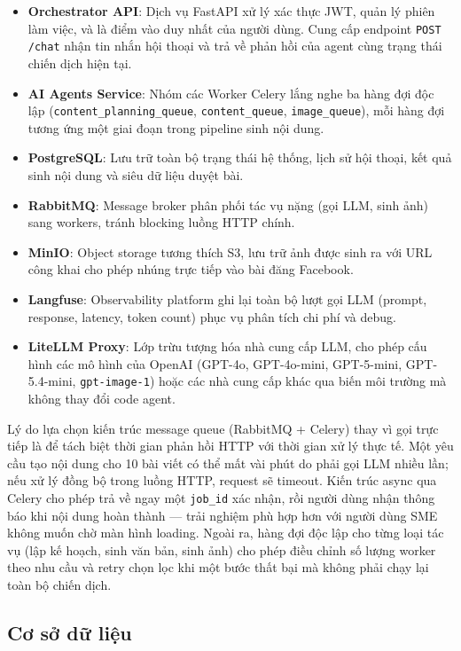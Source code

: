 \begin{itemize}
  \item \textbf{Orchestrator API}: Dịch vụ FastAPI xử lý xác thực JWT,
    quản lý phiên làm việc, và là điểm vào duy nhất của người dùng. Cung
    cấp endpoint \texttt{POST /chat} nhận tin nhắn hội thoại và trả về
    phản hồi của agent cùng trạng thái chiến dịch hiện tại.
  \item \textbf{AI Agents Service}: Nhóm các Worker Celery lắng nghe ba
    hàng đợi độc lập (\texttt{content\_planning\_queue},
    \texttt{content\_queue}, \texttt{image\_queue}), mỗi hàng đợi tương
    ứng một giai đoạn trong pipeline sinh nội dung.
  \item \textbf{PostgreSQL}: Lưu trữ toàn bộ trạng thái hệ thống, lịch
    sử hội thoại, kết quả sinh nội dung và siêu dữ liệu duyệt bài.
  \item \textbf{RabbitMQ}: Message broker phân phối tác vụ nặng (gọi LLM,
    sinh ảnh) sang workers, tránh blocking luồng HTTP chính.
  \item \textbf{MinIO}: Object storage tương thích S3, lưu trữ ảnh được
    sinh ra với URL công khai cho phép nhúng trực tiếp vào bài đăng
    Facebook.
  \item \textbf{Langfuse}: Observability platform ghi lại toàn bộ lượt
    gọi LLM (prompt, response, latency, token count) phục vụ phân tích
    chi phí và debug.
  \item \textbf{LiteLLM Proxy}: Lớp trừu tượng hóa nhà cung cấp LLM,
    cho phép cấu hình các mô hình của OpenAI (GPT-4o, GPT-4o-mini,
    GPT-5-mini, GPT-5.4-mini, \texttt{gpt-image-1}) hoặc các nhà cung
    cấp khác qua biến môi trường mà không thay đổi code agent.
\end{itemize}

Lý do lựa chọn kiến trúc message queue (RabbitMQ + Celery) thay vì gọi
trực tiếp là để tách biệt thời gian phản hồi HTTP với thời gian xử lý
thực tế. Một yêu cầu tạo nội dung cho 10 bài viết có thể mất vài phút
do phải gọi LLM nhiều lần; nếu xử lý đồng bộ trong luồng HTTP, request
sẽ timeout. Kiến trúc async qua Celery cho phép trả về ngay một
\texttt{job\_id} xác nhận, rồi người dùng nhận thông báo khi nội dung
hoàn thành --- trải nghiệm phù hợp hơn với người dùng SME không muốn
chờ màn hình loading. Ngoài ra, hàng đợi độc lập cho từng loại tác vụ
(lập kế hoạch, sinh văn bản, sinh ảnh) cho phép điều chỉnh số lượng
worker theo nhu cầu và retry chọn lọc khi một bước thất bại mà không
phải chạy lại toàn bộ chiến dịch.

\subsection{Cơ sở dữ liệu}\label{subsec:database}

